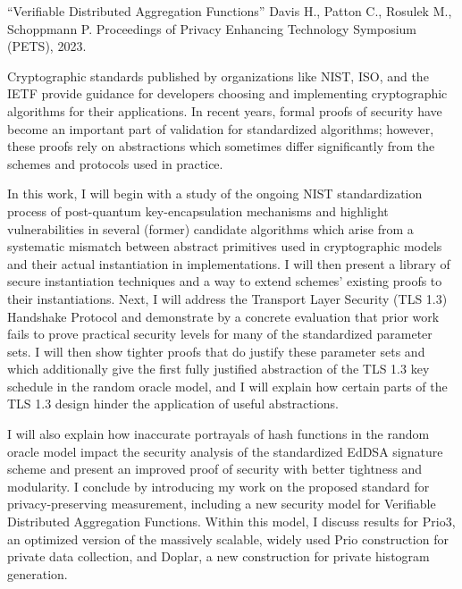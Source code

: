 \documentclass[11pt]{ucsddissertation}
\begin{document}
\begin{vita}
\noindent ``Verifiable Distributed Aggregation Functions'' Davis H., Patton C., Rosulek M., Schoppmann P.
Proceedings of Privacy Enhancing Technology Symposium (PETS), 2023.

\end{vita}

\begin{dissertationabstract}
	
	Cryptographic standards published by organizations like NIST, ISO, and the
	IETF provide guidance for developers choosing and implementing cryptographic
	algorithms for their applications. In recent years, formal proofs of security
	have become an important part of validation for standardized algorithms;
	however, these proofs rely on abstractions which sometimes differ
	significantly from the schemes and protocols used in practice.

	In this work, I will begin with a study of the ongoing NIST standardization
	process of post-quantum key-encapsulation mechanisms and highlight
	vulnerabilities in several (former) candidate algorithms which arise from a
	systematic mismatch between abstract primitives used in cryptographic models
	 and their actual instantiation in implementations. I will then present a
	 library of secure instantiation techniques and a way to extend schemes'
	 existing proofs to their instantiations. Next, I will address the Transport
	Layer Security (TLS 1.3) Handshake Protocol and demonstrate by a concrete
	evaluation that prior work fails to prove practical security levels for many
	of the standardized parameter sets. I will then show tighter proofs that do
	justify these parameter sets and which additionally give the first fully
	justified abstraction of the TLS 1.3 key schedule in the random oracle model,
	and I will explain how certain parts of the TLS 1.3 design hinder the
	application of useful abstractions.
	
	I will also explain how inaccurate portrayals of hash functions in the random
	oracle model impact the security analysis of the standardized EdDSA signature
	scheme and present an improved proof of security with better tightness and modularity.
	I conclude by introducing my work on the proposed standard for privacy-preserving
	measurement, including a new security model for Verifiable Distributed
	Aggregation Functions. Within this model, I discuss results for Prio3, an optimized
	version of the massively scalable, widely used Prio construction for private
	data collection, and Doplar, a new construction for private histogram generation.
\end{dissertationabstract}
\end{document}
